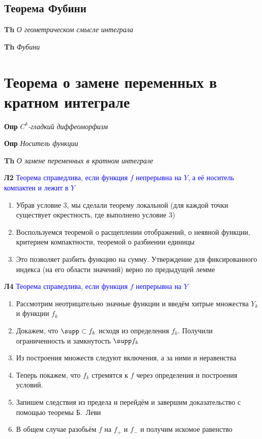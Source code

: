 \documentclass[a4paper, 14pt]{article}
\begin{document}
    \subsection{Теорема Фубини}
    
    \textbf{Th} \textit{О геометрическом смысле интеграла}
    
    \textbf{Th} \textit{Фубини}
    
    \section{Теорема о замене переменных в кратном интеграле}
    
    \textbf{Опр} \textit{$C^k$-гладкий диффеоморфизм}
    
    \textbf{Опр} \textit{Носитель функции}
    
    \textbf{Th} \textit{О замене переменных в кратном интеграле}
    
    \textbf{Л2}
    \textcolor{blue}{Теорема справедлива, если функция $f$ непрерывна на $Y$, а её носитель компактен и лежит в  $Y$}
    
    \begin{enumerate}
        \item Убрав условие 3, мы сделали теорему локальной (для каждой точки существует окрестность, где выполнено
        условие 3)
        \item Воспользуемся теоремой о расщеплении отображений, о неявной функции, критерием компактности, теоремой о
        разбиении единицы
        \item Это позволяет разбить функцию на сумму.
        Утверждение для фиксированного индекса (на его области значений) верно по предыдущей лемме
    \end{enumerate}
    
    \textbf{Л4}
    \textcolor{blue}{Теорема справедлива, если функция $f$ непрерывна на $Y$}
    
    \begin{enumerate}
        \item Рассмотрим неотрицательно значные функции и введём хитрые множества $Y_k$ и функции $f_k$
        \item Докажем, что $\supp \subset f_k$ исходя из определения $f_k$.
        Получили ограниченность и замкнутость $\supp f_k$
        \item Из построения множеств следуют включения, а за ними и неравенства
        \item Теперь покажем, что $f_k$ стремятся к $f$ через определения и построения условий.
        \item Запишем следствия из предела и перейдём и завершим доказательство с помощью теоремы Б.~Леви
        \item В общем случае разобьём $f$ на $f_+$ и $f_-$ и получим искомое равенство
    \end{enumerate}
    
\end{document}
